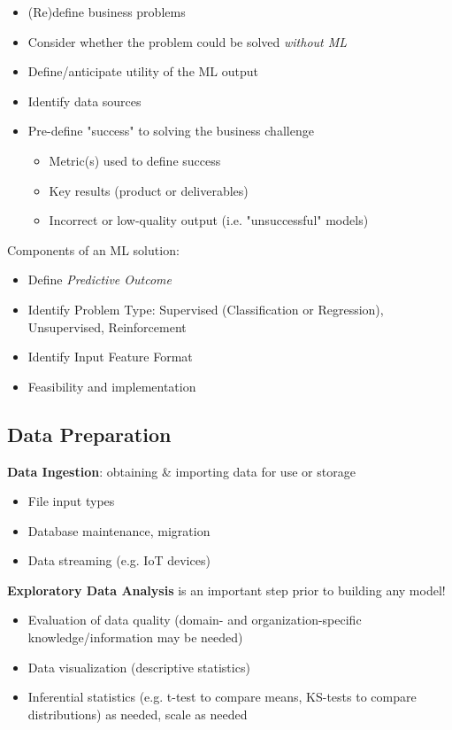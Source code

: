 \documentclass[10pt,landscape,letterpaper]{cheatsheet}
\begin{document}
\begin{multicols}{3}
\begin{itemize}
    \item (Re)define business problems
    \item Consider whether the problem could be solved \emph{without ML}
    \item Define/anticipate utility of the ML output
    \item Identify data sources
    \item Pre-define "success" to solving the business challenge
    \begin{itemize}
        \item Metric(s) used to define success
        \item Key results (product or deliverables)
        \item Incorrect or low-quality output (i.e. "unsuccessful" models)
    \end{itemize}
\end{itemize}

Components of an ML solution:

\begin{itemize}
    \item Define \emph{Predictive Outcome}
    \item Identify Problem Type: Supervised (Classification or Regression), Unsupervised, Reinforcement
    \item Identify Input Feature Format
    \item Feasibility and implementation
\end{itemize}

\subsection{Data Preparation}

\textbf{Data Ingestion}: obtaining \& importing data for use or storage

\begin{itemize}
    \item File input types
    \item Database maintenance, migration
    \item Data streaming (e.g. IoT devices)
\end{itemize}

\textbf{Exploratory Data Analysis} is an important step prior to building any model!

\begin{itemize}
    \item Evaluation of data quality (domain- and organization-specific knowledge/information may be needed)
    \item Data visualization (descriptive statistics)
    \item Inferential statistics (e.g. t-test to compare means, KS-tests to compare distributions) as needed, scale as needed
\end{itemize}


\end{multicols}
\end{document}
